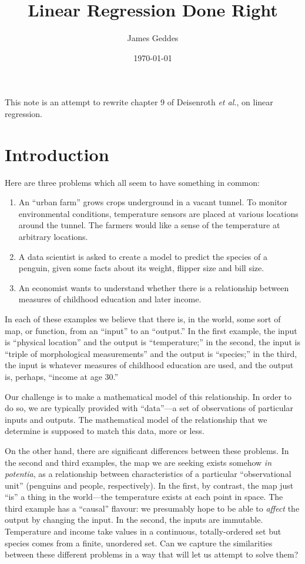\documentclass[11pt, a4paper]{article}
\author{James Geddes}
\date{\today}
\title{Linear Regression Done Right}
\begin{document}
\maketitle

This note is an attempt to rewrite chapter 9 of Deisenroth \emph{et
al.}, on linear regression.

\section*{Introduction}

Here are three problems which all seem to have something in common:

\begin{enumerate}
\item An ``urban farm'' grows crops underground in a vacant tunnel. To
  monitor environmental conditions, temperature sensors are placed at
  various locations around the tunnel. The farmers would like a sense
  of the temperature at arbitrary locations.
\item A data scientist is asked to create a model to predict the
  species of a penguin, given some facts about its weight, flipper
  size and bill size.
\item An economist wants to understand whether there is a relationship
  between measures of childhood education and later income.
\end{enumerate}

In each of these examples we believe that there is, in the world, some
sort of map, or function, from an “input” to an “output.” In the first
example, the input is “physical location” and the output is
“temperature;” in the second, the input is “triple of morphological
measurements” and the output is “species;” in the third, the input is
whatever measures of childhood education are used, and the output is,
perhaps, “income at age 30.”

Our challenge is to make a mathematical model of this relationship. In
order to do so, we are typically provided with “data”---a set of
observations of particular inputs and outputs. The mathematical model
of the relationship that we determine is supposed to match this data,
more or less.

On the other hand, there are significant differences between these
problems. In the second and third examples, the map we are seeking
exists somehow \emph{in potentia}, as a relationship between
characteristics of a particular “observational unit” (penguins and
people, respectively). In the first, by contrast, the map just “is” a
thing in the world---the temperature exists at each point in space. The
third example has a “causal” flavour: we presumably hope to be able to
\emph{affect} the output by changing the input. In the second, the
inputs are immutable. Temperature and income take values in a
continuous, totally-ordered set but species comes from a finite,
unordered set. Can we capture the similarities between these different
problems in a way that will let us attempt to solve them?
\end{document}
